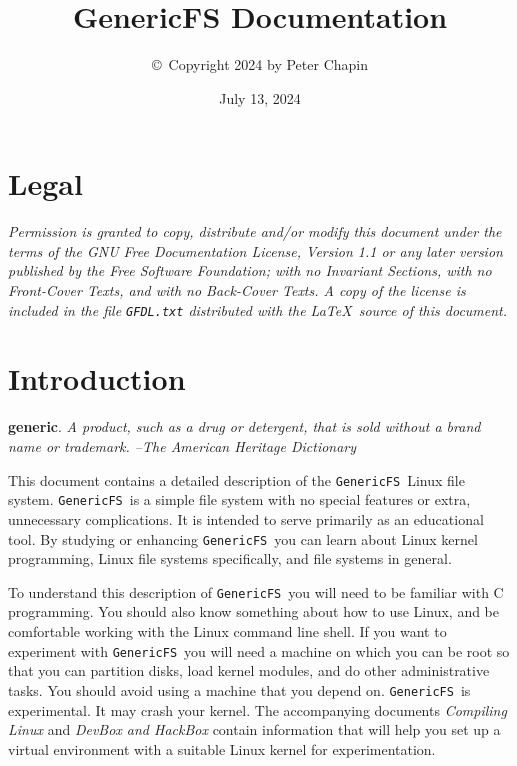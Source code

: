 \documentclass[twocolumn]{article}
\newcommand{\GenericFS}{\texttt{GenericFS}}
\begin{document}
\title{GenericFS Documentation}
\author{\copyright\ Copyright 2024 by Peter Chapin}
\date{July 13, 2024}
\maketitle

\tableofcontents

\section*{Legal}
\label{sec:legal}

\textit{Permission is granted to copy, distribute and/or modify this document under the terms of
the GNU Free Documentation License, Version 1.1 or any later version published by the Free
Software Foundation; with no Invariant Sections, with no Front-Cover Texts, and with no
Back-Cover Texts. A copy of the license is included in the file \texttt{GFDL.txt} distributed
with the \LaTeX\ source of this document.}

\section{Introduction}
\label{sec:intro}

\textbf{generic}. \textit{A product, such as a drug or detergent, that is sold without a brand
name or trademark. --The American Heritage Dictionary}

This document contains a detailed description of the \GenericFS\ Linux file system. \GenericFS\
is a simple file system with no special features or extra, unnecessary complications. It is
intended to serve primarily as an educational tool. By studying or enhancing \GenericFS\ you can
learn about Linux kernel programming, Linux file systems specifically, and file systems in
general.

To understand this description of \GenericFS\ you will need to be familiar with C programming.
You should also know something about how to use Linux, and be comfortable working with the Linux
command line shell. If you want to experiment with \GenericFS\ you will need a machine on which
you can be root so that you can partition disks, load kernel modules, and do other
administrative tasks. You should avoid using a machine that you depend on. \GenericFS\ is
experimental. It may crash your kernel. The accompanying documents \textit{Compiling Linux} and
\textit{DevBox and HackBox} contain information that will help you set up a virtual environment
with a suitable Linux kernel for experimentation.







\end{document}
